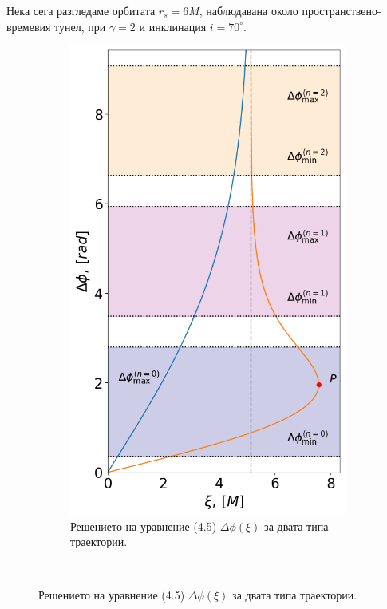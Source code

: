 \documentclass[12pt]{article}
\numberwithin{equation}{section}
\numberwithin{figure}{section}
\begin{document}
	Нека сега разгледаме орбитата $r_s = 6M$, наблюдавана около пространствено-времевия тунел, при $\gamma = 2$ и инклинация $i = 70^\circ$.
	\begin{figure}[h]
		\centering
		\begin{subfigure}{6cm}
			\centering
			\includegraphics[scale = 0.3]{Section_6_Morphology_of_the images_of_horizonless_spacetimes/WH_70_deg_r6_impact_gamma_2.png}
			\caption{Решението на уравнение (4.5) $\Delta\phi(\xi)$ за двата типа траектории.} \label{fig:1a}
		\end{subfigure}\,\,\,

\end{figure}
\end{document}

